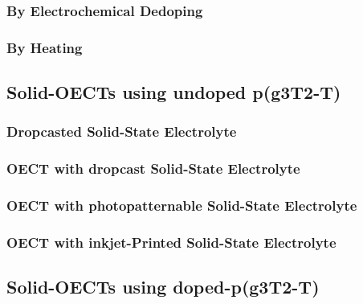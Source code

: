 \subsubsection{By Electrochemical Dedoping}

\subsubsection{By Heating}


\subsection{Solid-OECTs using undoped p(g3T2-T)}




\subsubsection{Dropcasted Solid-State Electrolyte}

\subsubsection{OECT with dropcast Solid-State Electrolyte}

\subsubsection{OECT with photopatternable Solid-State Electrolyte}

\subsubsection{OECT with inkjet-Printed Solid-State Electrolyte}


\subsection{Solid-OECTs using doped-p(g3T2-T)}

